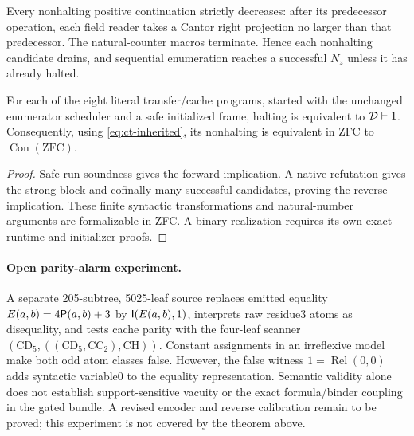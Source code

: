 Every nonhalting positive continuation strictly decreases: after its
predecessor operation, each field reader takes a Cantor right projection
no larger than that predecessor. The natural-counter macros terminate.
Hence each nonhalting candidate drains, and sequential enumeration
reaches a successful $N_z$ unless it has already halted.

\begin{theorem}
For each of the eight literal transfer/cache programs, started with
the unchanged enumerator scheduler and a safe initialized frame,
halting is equivalent to $\mathcal D\vdash1$. Consequently, using
\eqref{eq:ct-inherited}, its nonhalting is equivalent in ZFC to
$\operatorname{Con}(\mathrm{ZFC})$.
\end{theorem}

\begin{proof}
Safe-run soundness gives the forward implication. A native refutation
gives the strong block and cofinally many successful candidates, proving
the reverse implication. These finite syntactic transformations and
natural-number arguments are formalizable in ZFC. A binary realization
requires its own exact runtime and initializer proofs.
\end{proof}

\paragraph{Open parity-alarm experiment.}
A separate 205-subtree, 5025-leaf source replaces emitted equality
$E(a,b)=4\mathsf P(a,b)+3$ by $\mathsf I(E(a,b),1)$, interprets raw
residue3 atoms as disequality, and tests cache parity with the four-leaf
scanner $(\mathrm{CD}_5,((\mathrm{CD}_5,\mathrm{CC}_2),\mathrm{CH}))$.
Constant assignments in an irreflexive model make both odd atom classes
false. However, the false witness $1=\operatorname{Rel}(0,0)$ adds
syntactic variable0 to the equality representation. Semantic validity
alone does not establish support-sensitive vacuity or the exact
formula/binder coupling in the gated bundle. A revised encoder and
reverse calibration remain to be proved; this experiment is not covered
by the theorem above.
\endgroup

